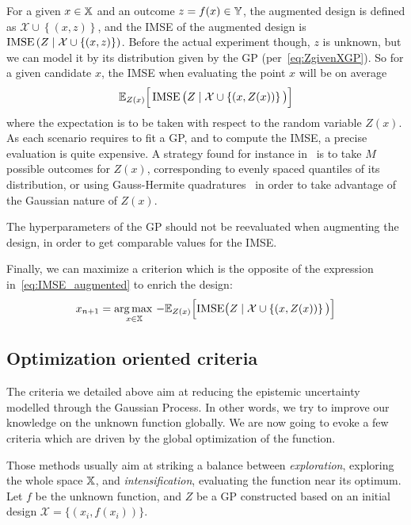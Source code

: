 \documentclass[../../Main_ManuscritThese.tex]{subfiles}
\begin{document}
For a given $x\in \mathbb{X}$ and an outcome $z=f(x)\in\mathbb{Y}$, the augmented design is defined as $\mathcal{X} \cup \left\{(x, z)\right\}$, and the IMSE of the augmented design is $\operatorname{\mathrm{IMSE}}\left(Z \mid \mathcal{X} \cup \left\{(x, z)\right\} \right)$.
Before the actual experiment though, $z$ is unknown, but we can model it by its distribution given by the GP (per~\cref{eq:ZgivenXGP}). So for a given candidate $x$, the IMSE when evaluating the point $x$ will be on average
\begin{equation}
  \label{eq:IMSE_augmented}
  \mathbb{E}_{Z(x)}\Big[\operatorname{\mathrm{IMSE}}\big(Z \mid \mathcal{X} \cup \left\{(x, Z(x))\right\} \big)\Big]
\end{equation}
where the expectation is to be taken with respect to the random variable $Z(x)$. As each scenario requires to fit a GP, and to compute the IMSE, a precise evaluation is quite expensive. A strategy found for instance in~\cite{villemonteix_informational_2006} is to take $M$ possible outcomes for $Z(x)$, corresponding to evenly spaced quantiles of its distribution, or using Gauss-Hermite quadratures~\cite{bernard_methodes_2019} in order to take advantage of the Gaussian nature of $Z(x)$.

The hyperparameters of the GP should not be reevaluated when augmenting the design, in order to get comparable values for the IMSE.\@

Finally, we can maximize a criterion which is the opposite of the expression in~\cref{eq:IMSE_augmented} to enrich the design:
\begin{equation}
  x_{n+1} = \operatorname*{arg\,max \,}_{x\in \mathbb{X}}-\mathbb{E}_{Z(x)}\Big[\mathrm{IMSE} \big(Z \mid \mathcal{X} \cup \left\{(x, Z(x))\right\} \big)\Big]
\end{equation}


\subsection{Optimization oriented criteria}
\label{sec:GP_optimization_criteria}
The criteria we detailed above aim at reducing the epistemic uncertainty modelled through the Gaussian Process. In other words, we try to improve our knowledge on the unknown function globally. We are now going to evoke a few criteria which are driven by the global optimization of the function.

Those methods usually aim at striking a balance between \emph{exploration}, exploring the whole space $\mathbb{X}$, and \emph{intensification}, evaluating the function near its optimum.
Let $f$ be the unknown function, and $Z$ be a GP constructed based on an initial design $\mathcal{X} = \{(x_i, f(x_i))\}$.
\end{document}
